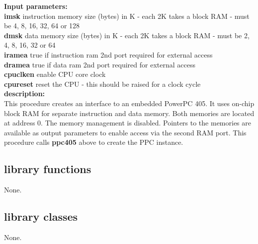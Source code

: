             {\bf Input parameters:} \\            
            {\bf imsk} instruction memory size (bytes) in K - each 2K takes a
                       block RAM - must be 4, 8, 16, 32, 64 or 128\\           
            {\bf dmsk} data memory size (bytes) in K - each 2K takes a block RAM -
                       must be 2, 4, 8, 16, 32 or 64\\
            {\bf iramea} true if instruction ram 2nd port required for external
                         access\\
            {\bf dramea} true if data ram 2nd port required for external access\\
            {\bf cpuclken} enable CPU core clock\\
            {\bf cpureset} reset the CPU - this should be raised for a clock cycle\\

            {\bf description:} \\
            This procedure creates an interface to an embedded PowerPC 405. It
            uses on-chip block RAM for separate instruction and data memory.
            Both memories are located at address 0. The memory management is
            disabled. Pointers to the memories are available as output
            parameters to enable access via the second RAM port.
            This procedure calls {\bf ppc405}  above
            to create the PPC instance.
    




    \subsection{library functions}
    
        None.



    \subsection{library classes}
    
        None.


